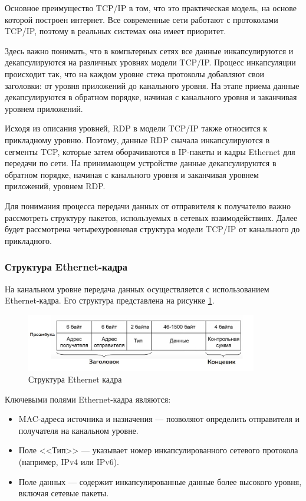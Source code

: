 \documentclass[bachelor, och, coursework]{SCWorks}
\begin{document}
Основное преимущество TCP/IP в том, что это практическая модель, на основе которой построен интернет. Все современные сети работают 
с протоколами TCP/IP, поэтому в реальных системах она имеет приоритет.

Здесь важно понимать, что в компьтерных сетях все данные инкапсулируются и декапсулируются на различных уровнях модели TCP/IP.
Процесс инкапсуляции происходит так, что на каждом уровне стека 
протоколы добавляют свои заголовки: от уровня приложений до канального уровня. На этапе приема данные декапсулируются в обратном порядке, начиная 
с канального уровня и заканчивая уровнем приложений. 

Исходя из описания уровней, RDP в модели TCP/IP также относится к прикладному уровню. Поэтому, данные RDP сначала инкапсулируются в сегменты TCP, 
которые затем оборачиваются в IP-пакеты и кадры Ethernet для передачи по сети. На принимающем устройстве данные декапсулируются в обратном 
порядке, начиная с канального уровня и заканчивая уровнем приложений, уровнем RDP.

Для понимания процесса передачи данных от отправителя к получателю важно рассмотреть структуру пакетов, используемых в сетевых взаимодействиях. Далее
будет рассмотрена четырехуровневая структура модели TCP/IP от канального до прикладного. 


\subsubsection{Структура Ethernet-кадра}

На канальном уровне передача данных осуществляется с использованием Ethernet-кадра. Его структура представлена на рисунке \ref{eth-frame}.

\begin{figure}[H]
  \centering
  \includegraphics[width=0.9\textwidth]{pics/eth-frame.jpg}
  \caption{Структура Ethernet кадра}
  \label{eth-frame}
\end{figure}

Ключевыми полями Ethernet-кадра являются:

\begin{itemize}
  \item MAC-адреса источника и назначения --- позволяют определить отправителя и получателя на канальном уровне.
  \item Поле <<Тип>> --- указывает номер инкапсулированного сетевого протокола (например, IPv4 или IPv6).
  \item Поле данных --- содержит инкапсулированные данные более высокого уровня, включая сетевые пакеты.
\end{itemize}
\end{document}
